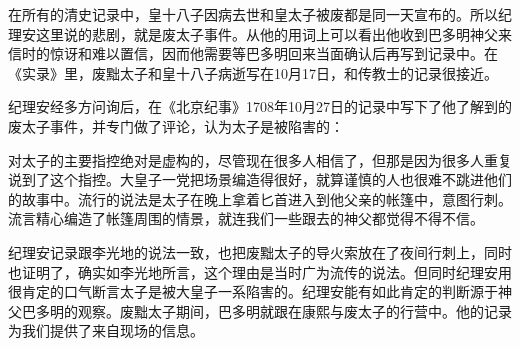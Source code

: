 
在所有的清史记录中，皇十八子因病去世和皇太子被废都是同一天宣布的。所以纪理安这里说的悲剧，就是废太子事件。从他的用词上可以看出他收到巴多明神父来信时的惊讶和难以置信，因而他需要等巴多明回来当面确认后再写到记录中。在《实录》里，废黜太子和皇十八子病逝写在10月17日，和传教士的记录很接近。



纪理安经多方问询后，在《北京纪事》1708年10月27日的记录中写下了他了解到的废太子事件，并专门做了评论，认为太子是被陷害的：



\begin{bookquote}对太子的主要指控绝对是虚构的，尽管现在很多人相信了，但那是因为很多人重复说到了这个指控。大皇子一党把场景编造得很好，就算谨慎的人也很难不跳进他们的故事中。流行的说法是太子在晚上拿着匕首进入到他父亲的帐篷中，意图行刺。流言精心编造了帐篷周围的情景，就连我们一些跟去的神父都觉得不得不信。\end{bookquote}


纪理安记录跟李光地的说法一致，也把废黜太子的导火索放在了夜间行刺上，同时也证明了，确实如李光地所言，这个理由是当时广为流传的说法。但同时纪理安用很肯定的口气断言太子是被大皇子一系陷害的。纪理安能有如此肯定的判断源于神父巴多明的观察。废黜太子期间，巴多明就跟在康熙与废太子的行营中。他的记录为我们提供了来自现场的信息。

\begin{sectionnotes}






\end{sectionnotes}
